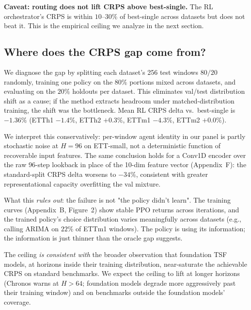 \documentclass{article}
\begin{document}
\textbf{Caveat: routing does not lift CRPS above best-single.}
The RL orchestrator's CRPS is within $10$--$30\%$ of best-single
across datasets but does not beat it. This is the empirical
ceiling we analyze in the next section.


\subsection{Where does the CRPS gap come from?}
\label{sec:ceiling}

We diagnose the gap by splitting each dataset's 256 test windows
$80/20$ randomly, training one policy on the $80\%$ portions mixed
across datasets, and evaluating on the $20\%$ holdouts per dataset.
This eliminates val/test distribution shift as a cause; if the method
extracts headroom under matched-distribution training, the shift was
the bottleneck. Mean RL CRPS delta vs.\ best-single is
$-1.36\%$ (ETTh1 $-1.4\%$, ETTh2 $+0.3\%$, ETTm1 $-4.3\%$, ETTm2 $+0.0\%$).

We interpret this conservatively: per-window agent identity in our
panel is partly stochastic noise at $H=96$ on ETT-small, not a
deterministic function of recoverable input features. The same
conclusion holds for a Conv1D encoder over the raw 96-step lookback
in place of the 10-dim feature vector (Appendix~F): the
standard-split CRPS delta worsens to $-34\%$, consistent with
greater representational capacity overfitting the val mixture.

What this \emph{rules out}: the failure is not "the policy didn't learn".
The training curves (Appendix~B, Figure~2) show stable PPO returns
across iterations, and the trained policy's choice distribution
varies meaningfully across datasets (e.g., calling ARIMA on $22\%$ of
ETTm1 windows). The policy is using its information; the information
is just thinner than the oracle gap suggests.

The ceiling \emph{is consistent with} the broader observation that
foundation TSF models, at horizons inside their training distribution,
near-saturate the achievable CRPS on standard benchmarks. We expect
the ceiling to lift at longer horizons (Chronos warns at $H>64$;
foundation models degrade more aggressively past their training
window) and on benchmarks outside the foundation models' coverage.
\end{document}
